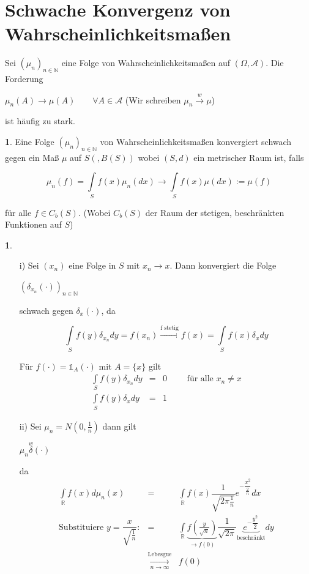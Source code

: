 \documentclass[10pt,a4paper]{report}
\newcommand{\N}{\mathbb{N}}
\newcommand{\R}{\mathbb{R}}
\numberwithin{equation}{section}
\numberwithin{figure}{section}
\theoremstyle{plain}
\theoremstyle{definition}
\newtheorem{defn}[thm]{\protect\definitionname}
\newtheorem{example}[thm]{\protect\examplename}
\theoremstyle{remark}
\theoremstyle{plain}
\providecommand{\definitionname}{Definition}
\providecommand{\examplename}{Beispiel}
\newcommand{\1}{ \mathbb{1} } %
\begin{document}
\section{Schwache Konvergenz von Wahrscheinlichkeitsmaßen}
Sei $(\mu_n)_{n \in \N}$ eine Folge von Wahrscheinlichkeitsmaßen auf $(\Omega,\mathcal{A})$. Die Forderung
\begin{center}
$\mu_n(A) \to \mu(A) \qquad \forall A \in \mathcal{A}$ (Wir schreiben $\mu_n \overset{w}{\to} \mu$)
\end{center}
ist häufig zu stark.
\begin{defn}
  Eine Folge $(\mu_n)_{n \in \N}$ von Wahrscheinlichkeitsmaßen konvergiert schwach
  gegen ein Maß $\mu$ auf $S(,B(S))$ wobei $(S,d)$ ein metrischer Raum
  ist, falls
  \begin{center}
    \[\mu_n(f)=\int\limits_S f(x)\mu_n(dx) \to
    \int\limits_Sf(x)\mu(dx):=\mu(f)\]
  \end{center}
  für alle $f \in C_b(S)$. (Wobei $C_b(S)$ der Raum der stetigen, beschränkten Funktionen auf $S$)
\end{defn}
\begin{example}
  \begin{itemize}
  \item[i)] Sei $(x_n)$ eine Folge in $S$ mit $x_n \to x$. Dann
    konvergiert die Folge
    \begin{center}
      $(\delta_{x_n}(\cdot))_{n \in \N}$
    \end{center}
    schwach gegen $\delta_x(\cdot)$, da
    \begin{center}
      \[\int\limits_Sf(y)\delta_{x_n} dy=f(x_n) \overset{\text{f
          stetig}}{\to} f(x)=\int\limits_S f(x)\delta_x dy \]
    \end{center}
    Für $f(\cdot)=\1_A(\cdot)$ mit $A=\{x\}$ gilt
    \begin{eqnarray*}
      \int\limits_S f(y)\delta_{x_n} dy &=& 0 \qquad \text{ für alle } x_n \neq x\\
      \int\limits_S f(y) \delta_x  dy &=& 1
    \end{eqnarray*}
  \item[ii)] Sei $\mu_n=N(0,\frac{1}{n})$ dann gilt
    \begin{center}
      $\mu_n \overset{w} \delta(\cdot)$
    \end{center}
    da
    \begin{eqnarray*}
      \int\limits_\R f(x) d\mu_n(x) &=& \int\limits_\R f(x)\dfrac{1}{\sqrt{2\pi \frac{1}{n}}}e^{-\dfrac{x^2}{\frac{2}{n}}} dx\\
      \text{Substituiere } y=\dfrac{x}{\sqrt{\frac{1}{n}}}: &=& \int\limits_\R \underbrace{f\left(\frac{y}{\sqrt{n}}\right)}_{\to f(0)} \dfrac{1}{\sqrt{2\pi}}\underbrace{e^{-\dfrac{y^2}{2}}}_{\text{beschränkt}} dy\\
      &\underset{n \to \infty}{\overset{\text{Lebesgue}}{\to}} &f(0)
    \end{eqnarray*}
  \end{itemize}
\end{example}
\end{document}
